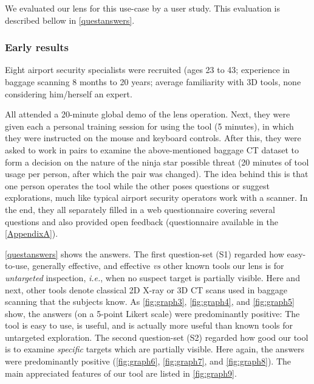 We evaluated our lens for this use-case by a user study. This evaluation is described bellow in \autoref{questanswers}.

\subsubsection{Early results}
\label{questanswers}

Eight airport security specialists were recruited (ages 23 to 43; experience in baggage scanning 8 months to 20 years; average familiarity with 3D tools, none considering him/herself an expert.


All attended a 20-minute global demo of the lens operation. Next, they were given each a personal training session for using the tool (5 minutes), in which they were instructed on the mouse and keyboard controls. After this, they were asked to work in pairs to examine the above-mentioned baggage CT dataset to form a decision on the nature of the ninja star possible threat (20 minutes of tool usage per person, after which the pair was changed). The idea behind this is that one person operates the tool while the other poses questions or suggest explorations, much like typical airport security operators work with a scanner. In the end, they all separately filled in a web questionnaire covering several questions and also provided open feedback (questionnaire available in the \autoref{AppendixA}). 


\autoref{questanswers} shows the answers. The first question-set (S1) regarded how easy-to-use, generally effective, and effective \emph{vs} other known tools our lens is for \emph{untargeted} inspection, \emph{i.e.}, when no suspect target is partially visible. Here and next, other tools denote classical 2D X-ray or 3D CT scans used in baggage scanning that the subjects know. As \autoref{fig:graph3}, \autoref{fig:graph4}, and \autoref{fig:graph5} show, 
the answers (on a 5-point Likert scale) were predominantly positive: The tool is easy to use, is useful, and is actually more useful than known tools for untargeted exploration. The second question-set (S2) regarded how good our tool is to examine \emph{specific} targets which are partially visible. Here again, the answers were predominantly positive (\autoref{fig:graph6}, \autoref{fig:graph7}, and \autoref{fig:graph8}). The main appreciated features of our tool are listed in \autoref{fig:graph9}.






